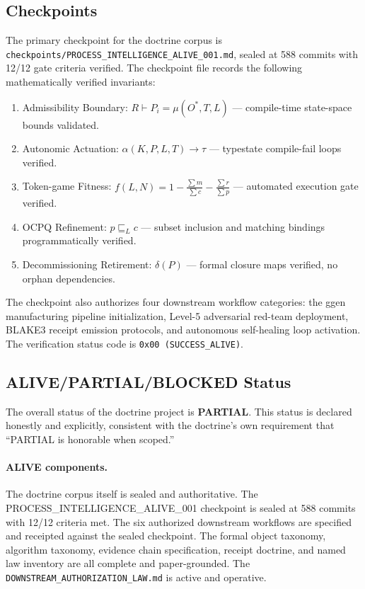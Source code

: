 \subsection{Checkpoints}
\label{sec:doctrine-evidence-checkpoints}

The primary checkpoint for the doctrine corpus is
\texttt{checkpoints/PROCESS\_INTELLIGENCE\_ALIVE\_001.md}, sealed at 588 commits with
12/12 gate criteria verified. The checkpoint file records the following mathematically
verified invariants:

\begin{enumerate}
  \item Admissibility Boundary: $R \vdash P_i = \mu(O^*, T, L)$ --- compile-time
    state-space bounds validated.
  \item Autonomic Actuation: $\alpha(K, P, L, T) \to \tau$ --- typestate compile-fail loops
    verified.
  \item Token-game Fitness: $f(L, N) = 1 - \frac{\sum m}{\sum c} - \frac{\sum r}{\sum p}$
    --- automated execution gate verified.
  \item OCPQ Refinement: $p \sqsubseteq_L c$ --- subset inclusion and matching bindings
    programmatically verified.
  \item Decommissioning Retirement: $\delta(P)$ --- formal closure maps verified, no orphan
    dependencies.
\end{enumerate}

The checkpoint also authorizes four downstream workflow categories: the ggen manufacturing
pipeline initialization, Level-5 adversarial red-team deployment, BLAKE3 receipt emission
protocols, and autonomous self-healing loop activation. The verification status code is
\texttt{0x00 (SUCCESS\_ALIVE)}.

\subsection{ALIVE/PARTIAL/BLOCKED Status}
\label{sec:doctrine-evidence-status}

The overall status of the doctrine project is \textbf{PARTIAL}. This status is declared
honestly and explicitly, consistent with the doctrine's own requirement that ``PARTIAL is
honorable when scoped.''

\paragraph{ALIVE components.} The doctrine corpus itself is sealed and authoritative. The
PROCESS\_INTELLIGENCE\_ALIVE\_001 checkpoint is sealed at 588 commits with 12/12 criteria
met. The six authorized downstream workflows are specified and receipted against the sealed
checkpoint. The formal object taxonomy, algorithm taxonomy, evidence chain specification,
receipt doctrine, and named law inventory are all complete and paper-grounded. The
\texttt{DOWNSTREAM\_AUTHORIZATION\_LAW.md} is active and operative.

